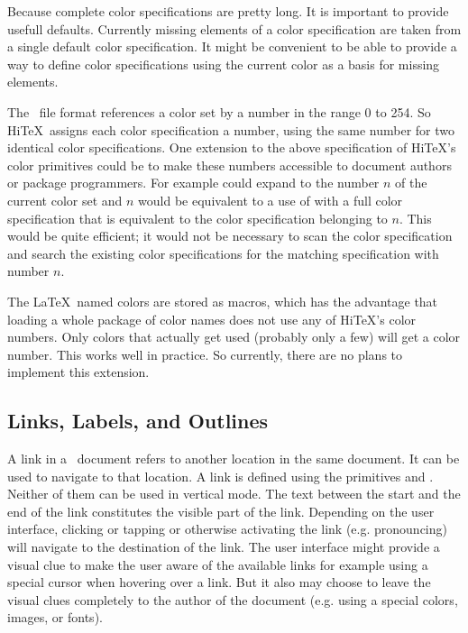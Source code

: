 \bigskip{}\par\smallskip\noindent
Because complete color specifications are pretty long. It is important
to provide usefull defaults. Currently missing elements of a color specification
are taken from a single default color specification. It might be convenient
to be able to provide a way to define color specifications using the
current color as a basis for missing elements.

\bigskip{}\par\smallskip\noindent
The \HINT\ file format references a color set by a number in the range
0 to 254.
So Hi\TeX\ assigns each color specification a number, using the same
number for two identical color specifications.
One extension to the above specification of Hi\TeX's color primitives
could be to make these numbers accessible to document authors or
package programmers. For example  could
expand to the number $n$ of the current color set and
$n$ would be equivalent to a use of 
with a full color specification that is equivalent to the color specification
belonging to $n$.
This would be quite efficient; it would not be necessary
to scan the color specification and search the existing color specifications
for the matching specification with number $n$.

The \LaTeX\ named colors are stored as macros, which has the advantage that
loading a whole package of color names does not use any of Hi\TeX's
color numbers. Only colors that actually get used (probably only a few)
will get a color number. This works well in practice.
So currently, there are no plans to implement this extension.

\subsection{Links, Labels, and Outlines}\label{llo}
A link in a \HINT\ document refers to another location in the same document.
It can be used to navigate to that location.
A link is defined using the primitives 
and .
Neither of them can be used in vertical mode.
The text between the start and the end of the link
constitutes the visible part of the link. Depending on the user interface, clicking
or tapping or otherwise activating the link (e.g. pronouncing)
will navigate to the destination of the link.
The user interface might provide a visual clue to make the user aware of the
available links for example using a special cursor when hovering over a link.
But it also may choose to leave the visual clues completely to the author
of the document (e.g. using a special colors, images, or fonts).

